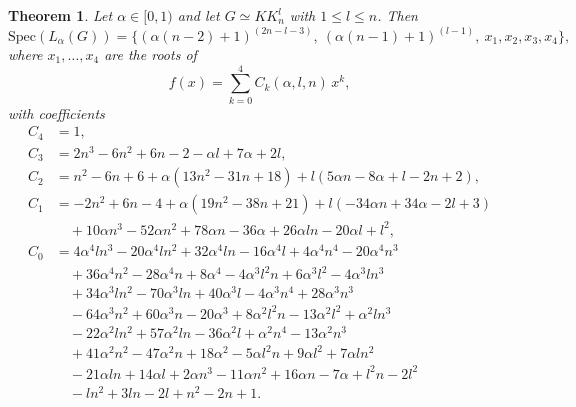 \documentclass{article}
\newtheorem{theorem}{Theorem}[section]
\begin{document}
\begin{theorem}
Let $\alpha \in [0,1)$ and let $G \simeq KK_n^l$ with $1 \leq l \leq n$. Then
\[
\mathrm{Spec}(L_{\alpha}(G)) = \{(\alpha(n-2)+1)^{(2n-l-3)},\ (\alpha(n-1)+ 1)^{(l-1)},\ x_1,x_2,x_3,x_4\},
\]
where $x_1,\dots,x_4$ are the roots of 
\[
f(x) = \sum_{k=0}^{4} C_k(\alpha, l, n)\, x^k,
\]
with coefficients
\begin{align*}
C_4 &= 1, \\
C_3 &= 2n^3 - 6n^2 + 6n - 2 - \alpha l + 7\alpha + 2l, \\
C_2 &= n^2 - 6n + 6 + \alpha(13n^2 - 31n + 18) + l(5\alpha n - 8\alpha + l - 2n + 2), \\
C_1 &= -2n^2 + 6n - 4 + \alpha(19n^2 - 38n + 21) + l(-34\alpha n + 34\alpha - 2l + 3) \\
    &\quad + 10\alpha n^3 - 52\alpha n^2 + 78\alpha n - 36\alpha + 26\alpha l n - 20\alpha l + l^2, \\
C_0 &= 4\alpha^4 l n^3 - 20\alpha^4 l n^2 + 32\alpha^4 l n - 16\alpha^4 l + 4\alpha^4 n^4 - 20\alpha^4 n^3 \\
    &\quad + 36\alpha^4 n^2 - 28\alpha^4 n + 8\alpha^4 - 4\alpha^3 l^2 n + 6\alpha^3 l^2 - 4\alpha^3 l n^3 \\
    &\quad + 34\alpha^3 l n^2 - 70\alpha^3 l n + 40\alpha^3 l - 4\alpha^3 n^4 + 28\alpha^3 n^3 \\
    &\quad - 64\alpha^3 n^2 + 60\alpha^3 n - 20\alpha^3 + 8\alpha^2 l^2 n - 13\alpha^2 l^2 + \alpha^2 l n^3 \\
    &\quad - 22\alpha^2 l n^2 + 57\alpha^2 l n - 36\alpha^2 l + \alpha^2 n^4 - 13\alpha^2 n^3 \\
    &\quad + 41\alpha^2 n^2 - 47\alpha^2 n + 18\alpha^2 - 5\alpha l^2 n + 9\alpha l^2 + 7\alpha l n^2 \\
    &\quad - 21\alpha l n + 14\alpha l + 2\alpha n^3 - 11\alpha n^2 + 16\alpha n - 7\alpha + l^2 n - 2l^2 \\
    &\quad - l n^2 + 3l n - 2l + n^2 - 2n + 1.
\end{align*}
\end{theorem}
\end{document}
